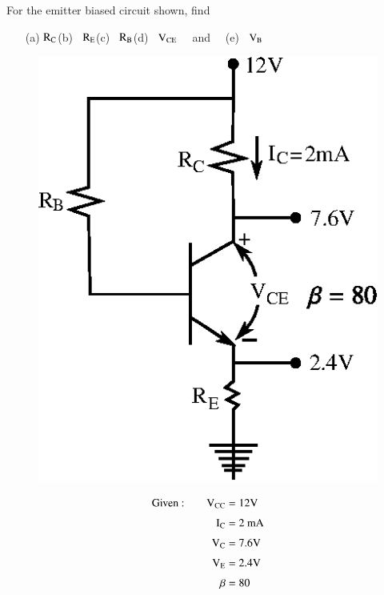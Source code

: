 \begin{problem}\label{prob3.5}
For the emitter biased circuit shown, find
\begin{itemize}
\item[(a)] $\textrm{R}_{\textrm{C}}$\quad (b)~ $\textrm{R}_{\textrm{E}}$\quad (c)~ $\textrm{R}_{\textrm{B}}$\quad (d)~ $\textrm{V}_{\text{CE}}$~~ and~~ (e)~ $\textrm{V}_{\textrm{B}}$
\end{itemize}
\noindent
\begin{minipage}[c]{7cm}
\begin{figure}[H]
\centering
\includegraphics{chap3/fig3.13.eps}
\end{figure}
\end{minipage}
\qquad
\begin{minipage}[c]{7cm}
\begin{align*}
\text{Given~:}\qquad \textrm{V}_{\text{CC}} &= 12\textrm{V}\\[3pt]
\textrm{I}_{\textrm{C}} &= 2\text{~mA}\\[3pt]
\textrm{V}_{\textrm{C}} &= 7.6\textrm{V}\\[3pt]
\textrm{V}_{\textrm{E}} &= 2.4\textrm{V}\\[3pt]
\beta &= 80
\end{align*}
\end{minipage}
\end{problem}

